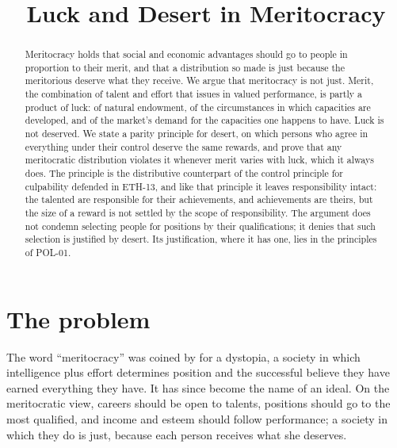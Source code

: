 \documentclass{situationist-preprint}
\title{Luck and Desert in Meritocracy}
\begin{document}
\maketitle

\begin{abstract}
Meritocracy holds that social and economic advantages should go to people in proportion to their merit, and that a distribution so made is just because the meritorious deserve what they receive. We argue that meritocracy is not just. Merit, the combination of talent and effort that issues in valued performance, is partly a product of luck: of natural endowment, of the circumstances in which capacities are developed, and of the market's demand for the capacities one happens to have. Luck is not deserved. We state a parity principle for desert, on which persons who agree in everything under their control deserve the same rewards, and prove that any meritocratic distribution violates it whenever merit varies with luck, which it always does. The principle is the distributive counterpart of the control principle for culpability defended in ETH-13, and like that principle it leaves responsibility intact: the talented are responsible for their achievements, and achievements are theirs, but the size of a reward is not settled by the scope of responsibility. The argument does not condemn selecting people for positions by their qualifications; it denies that such selection is justified by desert. Its justification, where it has one, lies in the principles of POL-01.
\end{abstract}

\section{The problem}

The word \enquote{meritocracy} was coined by \citet{Young1958} for a dystopia, a society in which intelligence plus effort determines position and the successful believe they have earned everything they have. It has since become the name of an ideal. On the meritocratic view, careers should be open to talents, positions should go to the most qualified, and income and esteem should follow performance; a society in which they do is just, because each person receives what she deserves.
\end{document}
